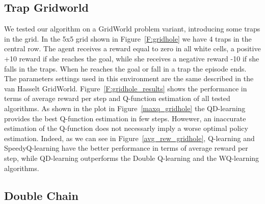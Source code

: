 \documentclass[conference]{IEEEtran}
\begin{document}
\subsection{Trap Gridworld}
We tested our algorithm on a GridWorld problem variant, introducing some traps in the grid. In the 5x5 grid shown in Figure~\ref{F:gridhole} we have 4 traps in the central row. The agent receives a reward equal to zero in all white cells, a positive +10 reward if she reaches the goal, while she receives a negative reward -10 if she falls in the traps. When he reaches the goal or fall in a trap the episode ends.
The parameters settings used in this environment are the same described in the van Hasselt GridWorld. Figure~\ref{F:gridhole_results} shows the performance in terms of average reward per step and Q-function estimation of all tested algorithms.
As shown in the plot in Figure~\ref{maxq_gridhole} the QD-learning provides the best Q-function estimation in few steps. Howewer, an inaccurate estimation of the Q-function does not necessarly imply a worse optimal policy estimation. Indeed, as we can see in Figure~\ref{avg_rew_gridhole}, Q-learning and SpeedyQ-learning have the better performance in terms of average reward per step, while QD-learning outperforms the Double Q-learning and the WQ-learning algorithms.

\subsection{Double Chain}
\end{document}
